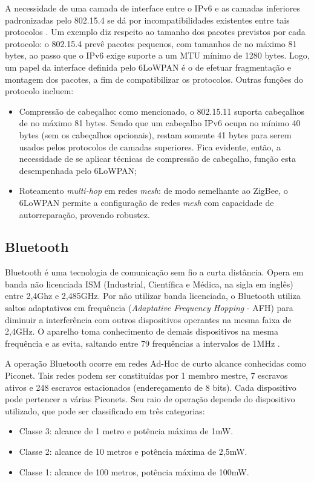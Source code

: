 A necessidade de uma camada de interface entre o IPv6 e as camadas inferiores padronizadas pelo 802.15.4 se dá por incompatibilidades existentes entre tais protocolos \cite{rfc4919}. Um exemplo diz respeito ao tamanho dos pacotes previstos por cada protocolo: o 802.15.4 prevê pacotes pequenos, com tamanhos de no máximo 81 bytes, ao passo que o IPv6 exige suporte a um MTU mínimo de 1280 bytes. Logo, um papel da interface definida pelo 6LoWPAN é o de efetuar fragmentação e montagem dos pacotes, a fim de compatibilizar os protocolos.
Outras funções do protocolo incluem:
\begin{itemize}
	\item Compressão de cabeçalho: como mencionado, o 802.15.11 suporta cabeçalhos de no máximo 81 bytes. Sendo que um cabeçalho IPv6 ocupa no mínimo 40 bytes (sem os cabeçalhos opcionais), restam somente 41 bytes para serem usados pelos protocolos de camadas superiores. Fica evidente, então, a necessidade de se aplicar técnicas de compressão de cabeçalho, função esta desempenhada pelo 6LoWPAN;
	\item Roteamento \textit{multi-hop} em redes \textit{mesh}: de modo semelhante ao ZigBee, o 6LoWPAN permite a configuração de redes \textit{mesh} com capacidade de  autorreparação, provendo robustez.
\end{itemize}

\subsection{Bluetooth}
Bluetooth é uma tecnologia de comunicação sem fio a curta distância. Opera em banda não licenciada ISM (Industrial, Científica e Médica, na sigla em inglês) entre 2,4Ghz e 2,485GHz.
Por não utilizar banda licenciada, o Bluetooth utiliza saltos adaptativos em frequência (\textit{Adaptative Frequency Hopping} - AFH) para diminuir a interferência com outros dispositivos operantes na mesma faixa de 2,4GHz. O aparelho toma conhecimento de demais dispositivos na mesma frequência e as evita, saltando entre 79 frequências a intervalos de 1MHz \cite{redesbluetooth}. 

A operação Bluetooth ocorre em redes Ad-Hoc de curto alcance conhecidas como Piconet. Tais redes podem ser constituídas por 1 membro mestre, 7 escravos ativos e 248 escravos estacionados (endereçamento de 8 bits). Cada dispositivo pode pertencer a várias Piconets. 
Seu raio de operação depende do dispositivo utilizado, que pode ser classificado em três categorias:
\begin{itemize}
        \item Classe 3: alcance de 1 metro e potência máxima de 1mW.
        \item Classe 2: alcance de 10 metros e potência máxima de 2,5mW.
        \item Classe 1: alcance de 100 metros, potência máxima de 100mW.
\end{itemize}

